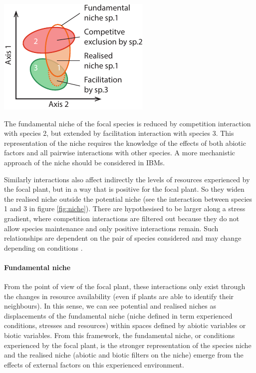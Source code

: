 \begin{marginfigure}
    \includegraphics{./1_Introduction/graphics/niches.pdf}
  \caption[Different niches]{The fundamental niche of the \textcolor{myOrange}{focal} species is reduced by competition interaction with \textcolor{myRed}{species 2}, but extended by facilitation interaction with \textcolor{myGreen}{species 3}. This representation of the niche requires the knowledge of the effects of both abiotic factors and all pairwise interactions with other species. A more mechanistic approach of the niche should be considered in IBMs.}
  \label{fig:niche}
\end{marginfigure}

Similarly  interactions also affect indirectly the levels of resources experienced by the focal plant, but in a way that is positive for the focal plant. So they widen the realised niche outside the potential niche (see the interaction between species 1 and 3 in figure \ref{fig:niche}). There are hypothesised to be larger along a stress gradient, where competition interactions are filtered out because they do not allow species maintenance and only positive interactions remain. Such relationships are dependent on the pair of species considered and may change depending on conditions \parencite{callaway_phenotypic_2003}.

\paragraph{Fundamental niche}
 From the point of view of the focal plant, these interactions only exist through the changes in resource availability (even if plants are able to identify their neighbours). In this sense, we can see potential and realised niches as displacements of the fundamental niche (niche defined in term experienced conditions, stresses and resources) within spaces defined by abiotic variables or biotic variables. From this framework, the fundamental niche, or conditions experienced by the focal plant, is the stronger representation of the species niche and the realised niche (abiotic and biotic filters on the niche) emerge from the effects of external factors on this experienced environment.

